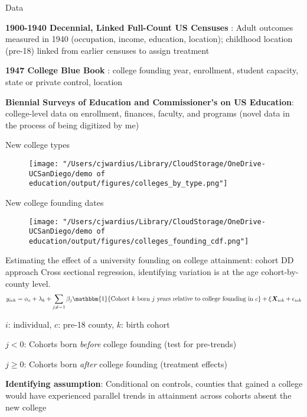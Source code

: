 \documentclass[notes,11pt, aspectratio=169]{beamer}
\newenvironment{wideitemize}{\itemize\addtolength{\itemsep}{10pt}}{\enditemize}
\begin{document}
\begin{frame}{Data}
  \begin{wideitemize}
    \item \textbf{1900-1940 Decennial, Linked Full-Count US Censuses} \cite{rugglesIPUMSUSAVersion2025}: Adult outcomes measured in 1940 (occupation, income, education, location); childhood location (pre-18) linked from earlier censuses to assign treatment
    \item \textbf{1947 College Blue Book} \cite{hurt1947college}: college founding year, enrollment, student capacity, state or private control, location
    \item \textbf{Biennial Surveys of Education and Commissioner's on US Education}: college-level data on enrollment, finances, faculty, and programs (novel data in the process of being digitized by me)  
  \end{wideitemize}
\end{frame}

\begin{frame}{New college types}
  \begin{figure}
        \centering
        \texttt{[image: "/Users/cjwardius/Library/CloudStorage/OneDrive-UCSanDiego/demo of education/output/figures/colleges\_by\_type.png"]}
    \end{figure}
\end{frame}

\begin{frame}{New college founding dates}
  \begin{figure}
        \centering
        \texttt{[image: "/Users/cjwardius/Library/CloudStorage/OneDrive-UCSanDiego/demo of education/output/figures/colleges\_founding\_cdf.png"]}
    \end{figure}
\end{frame}




\begin{frame}{Estimating the effect of a university founding on college attainment: cohort DD approach}
  Cross sectional regression, identifying variation is at the age cohort-by-county level.
  \begin{equation}
    y_{ick} = \alpha_c + \lambda_k + \sum_{j \neq -1} \beta_j \mathbbm{1}\{\text{Cohort } k \text{ born } j \text{ years relative to college founding in } c\} + \xi \bm{X}_{ick} + \epsilon_{ick}
  \end{equation}
  \begin{wideitemize}
    \item $i$: individual, $c$: pre-18 county, $k$: birth cohort
    \item $j < 0$: Cohorts born \textit{before} college founding (test for pre-trends)
    \item $j \geq 0$: Cohorts born \textit{after} college founding (treatment effects)
    \item \textbf{Identifying assumption}: Conditional on controls, counties that gained a college would have experienced parallel trends in attainment across cohorts absent the new college
  \end{wideitemize}
\end{frame}
\end{document}
